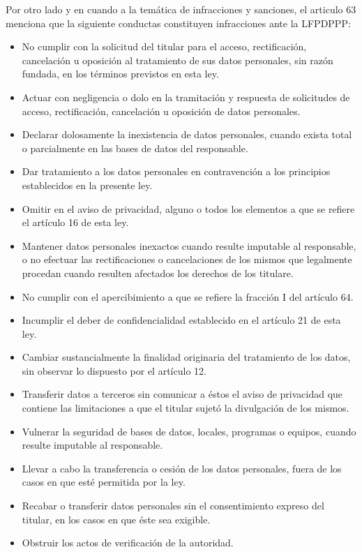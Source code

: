 \documentclass[runningheads,a4paper]{llncs}
\begin{document}
Por otro  lado y en cuando a la temática de infracciones y sanciones, el articulo 63 menciona que la siguiente conductas constituyen infracciones ante la \gls{LFPDPPP}:

\begin{itemize}
	\item No cumplir con la solicitud del titular para el acceso, rectificación, cancelación u oposición al
tratamiento de sus datos personales, sin razón fundada, en los términos previstos en esta ley.
	\item Actuar con negligencia o dolo en la tramitación y respuesta de solicitudes de acceso,
rectificación, cancelación u oposición de datos personales.
	\item Declarar dolosamente la inexistencia de datos personales, cuando exista total o parcialmente en
las bases de datos del responsable.
	\item Dar tratamiento a los datos personales en contravención a los principios establecidos en la
presente ley.
	\item Omitir en el aviso de privacidad, alguno o todos los elementos a que se refiere el artículo 16 de
esta ley.
	\item Mantener datos personales inexactos cuando resulte imputable al responsable, o no efectuar las
rectificaciones o cancelaciones de los mismos que legalmente procedan cuando resulten
afectados los derechos de los titulare.
	\item No cumplir con el apercibimiento a que se refiere la fracción I del artículo 64.
	\item Incumplir el deber de confidencialidad establecido en el artículo 21 de esta ley.
	\item Cambiar sustancialmente la finalidad originaria del tratamiento de los datos, sin observar lo
dispuesto por el artículo 12.
	\item Transferir datos a terceros sin comunicar a éstos el aviso de privacidad que contiene las
limitaciones a que el titular sujetó la divulgación de los mismos.
	\item Vulnerar la seguridad de bases de datos, locales, programas o equipos, cuando resulte
imputable al responsable.
	\item Llevar a cabo la transferencia o cesión de los datos personales, fuera de los casos en que esté
permitida por la ley.
	\item Recabar o transferir datos personales sin el consentimiento expreso del titular, en los casos en
que éste sea exigible.
	\item Obstruir los actos de verificación de la autoridad.

\end{itemize}
\end{document}
